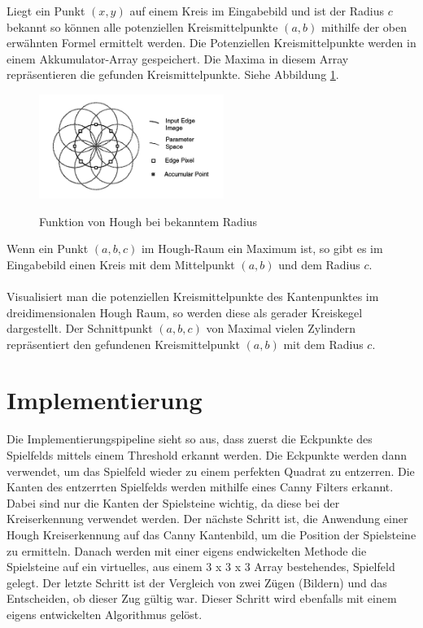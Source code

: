 \documentclass[paper=A4, deutsch]{scrartcl}
\begin{document}
Liegt ein Punkt \((x,y)\) auf einem Kreis im Eingabebild und ist der Radius \(c\) bekannt so k\"onnen alle potenziellen Kreismittelpunkte \((a,b)\) mithilfe der oben erwähnten Formel ermittelt werden. Die Potenziellen Kreismittelpunkte werden in einem Akkumulator-Array gespeichert. Die Maxima in diesem Array repräsentieren die gefunden Kreismittelpunkte. Siehe Abbildung \ref{fig:hough2d}.\\

\begin{figure}[ht]
	\centering
		\includegraphics[width=6cm]{2dhough_darstellung.png}\\
	\caption[Funktion von Hough bei bekanntem Radius]{Funktion von Hough bei bekanntem Radius}
	\label{fig:hough2d}
\end{figure}

Wenn ein Punkt \((a,b,c)\) im Hough-Raum ein Maximum ist, so gibt es im Eingabebild einen Kreis mit dem Mittelpunkt \((a,b)\) und dem Radius  \(c\).
\\
\\
Visualisiert man die potenziellen Kreismittelpunkte des Kantenpunktes im dreidimensionalen Hough Raum, so werden diese als gerader Kreiskegel dargestellt. Der Schnittpunkt \((a,b,c)\) von Maximal vielen Zylindern repräsentiert den gefundenen Kreismittelpunkt \((a,b)\) mit dem Radius \( c\).


\section{Implementierung}
Die Implementierungspipeline sieht so aus, dass zuerst die Eckpunkte des Spielfelds mittels  einem Threshold erkannt werden. Die Eckpunkte werden dann verwendet, um das Spielfeld wieder zu einem perfekten Quadrat zu entzerren. Die Kanten des entzerrten Spielfelds werden mithilfe eines Canny Filters erkannt. Dabei sind nur die Kanten der Spielsteine wichtig, da diese bei der Kreiserkennung verwendet werden. Der nächste Schritt ist, die Anwendung einer Hough Kreiserkennung auf das Canny Kantenbild, um die Position der Spielsteine zu ermitteln. Danach werden mit einer eigens endwickelten Methode die Spielsteine auf ein virtuelles, aus einem 3 x 3 x 3 Array bestehendes, Spielfeld gelegt. Der letzte Schritt ist der Vergleich von zwei Zügen (Bildern) und das Entscheiden, ob dieser Zug gültig war. Dieser Schritt wird ebenfalls mit einem eigens entwickelten Algorithmus gelöst.
\end{document}

